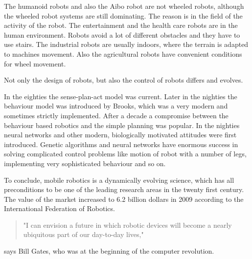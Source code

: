   The humanoid robots and also the Aibo robot are not  wheeled robots, although the wheeled 
  robot systems are still	dominating. The reason is in the field of the activity of the robot. 
  The entertainment and the health care robots are in the human environment. 
  Robots avoid a lot of different obstacles and they have to use stairs.
  The industrial robots are usually indoors, where the terrain is adapted to machines movement. 
  Also the agricultural robots have convenient conditions for wheel movement.
  
  Not only the design of robots, but also the control of robots differs and evolves.
  
  In the eighties the sense-plan-act model was current.
  Later in the nighties the behaviour model was introduced by Brooks,
  which was a very modern and sometimes strictly implemented.	
  After a decade a compromise between the behaviour based robotics and the simple planning was popular.
  In the nighties neural networks and other modern, biologically motivated attitudes were first introduced.
  Genetic algorithms and neural networks have enormous success in solving complicated control problems like motion of
  robot with a number of legs, implementing very sophisticated behaviour and so on.
  
  To conclude, mobile robotics is a dynamically evolving science,
  which has all preconditions to be one of the leading research areas in the twenty first century.
  The value of the market increased to 6.2 billion dollars in 2009 according to the International Federation of Robotics.
  \cite{worldrob}
  \begin{quote}	 	
  "I can envision a future in which robotic devices will become a nearly ubiquitous part of our day-to-day lives," 
  \end{quote}
  says Bill Gates, who was at the beginning of the computer revolution. %
  



